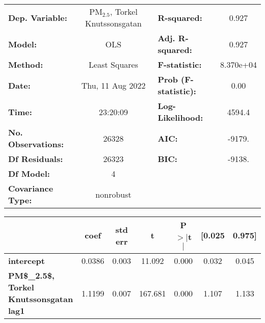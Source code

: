 \begin{landscape}
\begin{table}[h]
\begin{center}
\begin{tabular}{lclc}
\toprule
\textbf{Dep. Variable:}                            & PM$_{2.5}$, Torkel Knutssonsgatan & \textbf{  R-squared:         } &     0.927   \\
\textbf{Model:}                                    &                 OLS                  & \textbf{  Adj. R-squared:    } &     0.927   \\
\textbf{Method:}                                   &            Least Squares             & \textbf{  F-statistic:       } & 8.370e+04   \\
\textbf{Date:}                                     &           Thu, 11 Aug 2022           & \textbf{  Prob (F-statistic):} &     0.00    \\
\textbf{Time:}                                     &               23:20:09               & \textbf{  Log-Likelihood:    } &    4594.4   \\
\textbf{No. Observations:}                         &                 26328                & \textbf{  AIC:               } &    -9179.   \\
\textbf{Df Residuals:}                             &                 26323                & \textbf{  BIC:               } &    -9138.   \\
\textbf{Df Model:}                                 &                     4                & \textbf{                     } &             \\
\textbf{Covariance Type:}                          &              nonrobust               & \textbf{                     } &             \\
\bottomrule
\end{tabular}
\begin{tabular}{lcccccc}
                                                   & \textbf{coef} & \textbf{std err} & \textbf{t} & \textbf{P$> |$t$|$} & \textbf{[0.025} & \textbf{0.975]}  \\
\midrule
\textbf{intercept}                                 &       0.0386  &        0.003     &    11.092  &         0.000        &        0.032    &        0.045     \\
\textbf{PM\$\_{2.5}\$, Torkel Knutssonsgatan lag1} &       1.1199  &        0.007     &   167.681  &         0.000        &        1.107    &        1.133     \\

\end{tabular}
\end{center}
\end{table}
\end{landscape}
